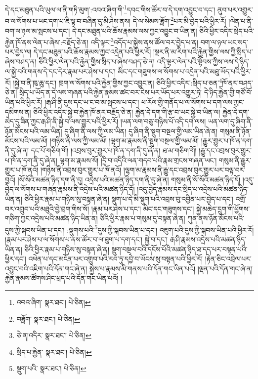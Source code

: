 དེ་དང་མཐུན་པའི་ཡུལ་ལ་ནི་གཏི་མུག་:འབའ་ཞིག་གི་\footnote{འབའ་ཞིག་  སྣར་ཐང་།  པེ་ཅིན། }དབང་གིས་ཚོར་བ་དེ་དག་འབྱུང་བ་དང་། ནུབ་པར་འགྱུར་བ་ལ་སོགས་པ་ཡང་དག་པ་ཇི་ལྟ་བ་བཞིན་དུ་མི་ཤེས་ནས། དེ་ལ་སེམས་ཟློག་\footnote{བཟློག་  སྣར་ཐང་།  པེ་ཅིན། }པར་མི་བྱེད་པའི་ཕྱིར་རོ། །ལེན་པ་ནི་བག་ལ་ཉལ་མ་སྤངས་པ་དང་། དེ་དང་མཐུན་པའི་ཆོས་རྣམས་ལས་ཀྱང་འབྱུང་བ་ཡིན་ན། ཅིའི་ཕྱིར་འདིར་སྲེད་པའི་རྐྱེན་ཁོ་ནས་ལེན་པ་ཞེས་:བརྗོད་ཅེ་ན། འདི་ལྟར་\footnote{ཅེ་ན།འདིར་  སྣར་ཐང་།  པེ་ཅིན། }འདོད་པ་སྐྱེས་ནས་ཚོལ་བར་བྱེད་པ་ན། བག་ལ་ཉལ་ཡང་སད་པར་བྱེད་ལ། དེ་དང་མཐུན་པའི་ཆོས་རྣམས་ཀྱང་འདྲེན་པའི་ཕྱིར་རོ། །སྔར་ནི་མ་རིག་པའི་རྐྱེན་གྱིས་ལས་ཀྱི་སྲིད་པ་ཞེས་བཤད་ན། ཅིའི་ཕྱིར་ལེན་པའི་རྐྱེན་གྱིས་སྲིད་པ་ཞེས་བཤད་ཅེ་ན། འདི་ལྟར་ལེན་པའི་སྟོབས་ཀྱིས་ལས་དེ་ཉིད་ལ་སྐྱེ་བའི་གནས་དེ་དང་དེར་རྣམ་པར་ཤེས་པ་དང་། མིང་དང་གཟུགས་ལ་སོགས་པ་འདྲེན་པའི་མཐུ་ཡོད་པའི་ཕྱིར་རོ། །སྐྱེ་བ་ནི་ཁུ་ཆུ་དང་། ཁྲག་ལ་སོགས་པའི་རྐྱེན་གྱིས་ཀྱང་འབྱུང་ན། ཅིའི་ཕྱིར་འདིར་:སྲིད་པ་ཅན་\footnote{སྲིད་པ་རྐྱེན་  སྣར་ཐང་།  པེ་ཅིན། }ཁོ་ནར་བཤད་ཅེ་ན། སྲིད་པ་ཡོད་ན་དེ་ལས་གཞན་པའི་རྐྱེན་རྣམས་ཚང་བར་ངེས་པར་ཡོད་པར་འགྱུར་ཏེ། དེ་ཉིད་རྐྱེན་གྱི་གཙོ་བོ་ཡིན་པའི་ཕྱིར་རོ། །རྒ་ཤི་ནི་དུས་དང་ཡ་ང་བ་མ་སྤངས་པ་དང་། ཕ་རོལ་གྱི་གནོད་པ་ལ་སོགས་པ་དག་ལས་ཀྱང་དམིགས་ན། ཅིའི་ཕྱིར་འདིར་སྐྱེ་བ་རྐྱེན་ཁོ་ནར་བརྗོད་ཅེ་ན། རྐྱེན་དེ་དག་གི་རྩ་བ་ཡང་སྐྱེ་བ་ཡིན་ལ། རྐྱེན་དེ་དག་མེད་དུ་ཟིན་ཀྱང་རྒ་ཤི་ནི་སྐྱེ་བ་ལས་གྱུར་པའི་ཕྱིར་རོ། །ཡན་ལག་བཅུ་གཉིས་པོ་འདི་དག་ལས། ཡན་ལག་དུ་ཞིག་ནི་ཉོན་མོངས་པའི་ལམ་ཡིན། དུ་ཞིག་ནི་ལས་ཀྱི་ལམ་ཡིན། དུ་ཞིག་ནི་སྡུག་བསྔལ་གྱི་ལམ་ཡིན་ཞེ་ན། གསུམ་ནི་ཉོན་མོངས་པའི་ལམ་མོ། །གཉིས་ནི་ལས་ཀྱི་ལམ་མོ། །ལྷག་མ་རྣམས་ནི་སྡུག་བསྔལ་གྱི་ལམ་མོ། །རྒྱུར་གྱུར་པ་ཁོ་ན་དག་ནི་དུ་ཞེ་ན། དང་པོ་གཅིག་གོ། །འབྲས་བུར་གྱུར་པ་ཁོ་ན་དག་ནི་དུ་ཞེ་ན། ཐ་མ་གཅིག་གོ། །རྒྱུ་དང་འབྲས་བུར་གྱུར་པ་ཁོ་ན་དག་ནི་དུ་ཞེ་ན། ལྷག་མ་རྣམས་སོ། །དྲི་བ་འདིའི་ལན་གདབ་པའི་རྣམ་གྲངས་གཞན་ཡང་། གསུམ་ནི་རྒྱུར་གྱུར་པ་ཁོ་ནའོ། །གཉིས་ནི་འབྲས་བུར་གྱུར་པ་ཁོ་ནའོ། །ལྷག་མ་རྣམས་ནི་རྒྱུ་དང་འབྲས་བུར་གྱུར་པར་བལྟ་བར་བྱའོ། །སོ་སོའི་མཚན་ཉིད་དག་ནི་དུ། འདྲེས་པའི་མཚན་ཉིད་དག་ནི་དུ་ཞེ་ན། གསུམ་ནི་སོ་སོའི་མཚན་ཉིད་དོ། །འདུ་བྱེད་ལ་སོགས་པ་གཞན་རྣམས་ནི་འདྲེས་པའི་མཚན་ཉིད་དོ། །འདུ་བྱེད་རྣམས་དང་སྲིད་པ་འདྲེས་པའི་མཚན་ཉིད་ཡིན་ན། ཅིའི་ཕྱིར་རྣམ་པ་གཉིས་སུ་བསྟན་ཞེ་ན། སྡུག་པ་དེ་མི་སྡུག་པའི་འབྲས་བུ་འབྱིན་པར་བྱེད་པ་དང་། འགྲོ་བར་འགྲུབ་པའི་མཐུའི་བྱེ་བྲག་གིས་སོ། །རྣམ་པར་ཤེས་པ་དང་། མིང་དང་གཟུགས་དང་། སྐྱེ་མཆེད་དྲུག་གི་ཕྱོགས་གཅིག་ཀྱང་འདྲེས་པའི་མཚན་ཉིད་ཡིན་ན། ཅིའི་ཕྱིར་རྣམ་པ་གསུམ་དུ་བསྟན་ཞེ་ན། ཀུན་ནས་ཉོན་མོངས་པའི་དུས་ཀྱི་སྐབས་ཡིན་པ་དང་། :ལྡུགས་པའི་\footnote{སྡུག་པའི་  སྣར་ཐང་།  པེ་ཅིན། }དུས་ཀྱི་སྐབས་ཡིན་པ་དང་། འཇུག་པའི་དུས་ཀྱི་སྐབས་ཡིན་པའི་ཕྱིར་རོ། །རྣམ་པར་ཤེས་པ་ལ་སོགས་པ་ནས་ཚོར་བ་ལ་ཐུག་པ་དག་དང་། སྐྱེ་བ་དང་། རྒ་ཤི་རྣམས་འདྲེས་པའི་མཚན་ཉིད་ཡིན་ན། ཅིའི་ཕྱིར་རྣམ་པ་གཉིས་སུ་བསྟན་ཞེ་ན། སྡུག་བསྔལ་བའི་དངོས་པོའི་མཚན་ཉིད་ཐ་དད་པར་བསྟན་པའི་ཕྱིར་དང་། འཕེན་པ་དང་མངོན་པར་འགྲུབ་པའི་རབ་ཏུ་དབྱེ་བ་ཡོངས་སུ་བསྟན་པའི་ཕྱིར་རོ། །རྟེན་ཅིང་འབྲེལ་པར་འབྱུང་བའི་འཇིག་པའི་དོན་གང་ཞེ་ན། སྐྱེས་པ་རྣམས་མི་གནས་པའི་དོན་གང་ཡིན་པའོ། །ལྡན་པའི་དོན་གང་ཞེ་ན། རྐྱེན་རྣམས་ཚོགས་ཤིང་ཕྲད་པའི་དོན་གང་ཡིན་པའོ། །

